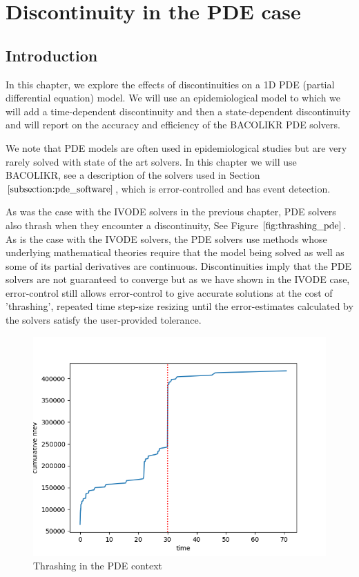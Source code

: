 \documentclass{article}
\begin{document}
\section{Discontinuity in the PDE case}
\subsection{Introduction}
\label{subsection:pde_intro}
In this chapter, we explore the effects of discontinuities on a 1D PDE (partial differential equation) model. We will use an epidemiological model to which we will add a time-dependent discontinuity and then a state-dependent discontinuity and will report on the accuracy and efficiency of the BACOLIKR PDE solvers.

We note that PDE models are often used in epidemiological studies but are very rarely solved with state of the art solvers. In this chapter we will use BACOLIKR, see a description of the solvers used in Section $\ref{subsection:pde_software}$, which is error-controlled and has event detection.

As was the case with the IVODE solvers in the previous chapter, PDE solvers also thrash when they encounter a discontinuity, See Figure $\ref{fig:thrashing_pde}$. As is the case with the IVODE solvers, the PDE solvers use methods whose underlying mathematical theories require that the model being solved as well as some of its partial derivatives are continuous. Discontinuities imply that the PDE solvers are not guaranteed to converge but as we have shown in the IVODE case, error-control still allows error-control to give accurate solutions at the cost of 'thrashing', repeated time step-size resizing until the error-estimates calculated by the solvers satisfy the user-provided tolerance.  

\begin{figure}[H]
\centering
\includegraphics[width=0.7\linewidth]{./figures/pde_thrashing}
\caption{Thrashing in the PDE context}
\label{fig:thrashing_pde}
\end{figure}
\end{document}
